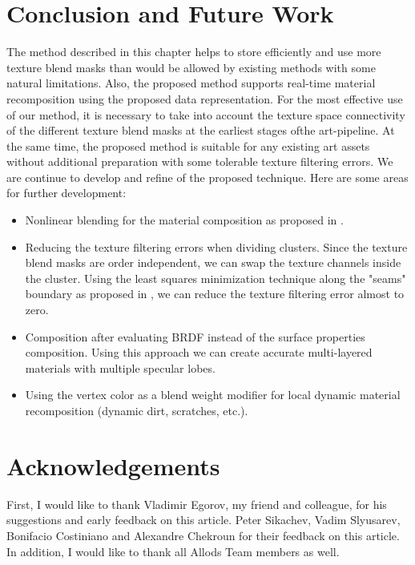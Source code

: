\section{Conclusion and Future Work}

The method described in this chapter helps to store efficiently and use more texture blend masks than would be allowed by existing methods with some natural limitations.
Also, the proposed method supports real-time material recomposition using the proposed data representation. 
For the most effective use of our method, it is necessary to take into account the texture space connectivity of the different texture blend masks at the earliest stages ofthe  art-pipeline.
At the same time, the proposed method is suitable for any existing art assets without additional preparation with some tolerable texture filtering errors.
We are continue to develop and refine of the proposed technique.
Here are some areas for further development:

\begin{itemize}  
\item Nonlinear blending for the material composition as proposed in \cite{BlendMaps}.
\item Reducing the texture filtering errors when dividing clusters.
Since the texture blend masks are order independent, we can swap the texture channels inside the cluster.
Using the least squares minimization technique along the "seams" boundary as proposed in \cite{IwanickiLightmaps}, we can reduce the texture filtering error almost to zero.
\item Composition after evaluating BRDF instead of the surface properties composition.
Using this approach we can create accurate multi-layered materials with multiple specular lobes.
\item Using the vertex color as a blend weight modifier for local dynamic material recomposition (dynamic dirt, scratches, etc.).
\end{itemize}

\section{Acknowledgements}

First, I would like to thank Vladimir Egorov, my friend and colleague, for his suggestions and early feedback on this article.
Peter Sikachev, Vadim Slyusarev, Bonifacio Costiniano and Alexandre Chekroun for their feedback on this article.
In addition, I would like to thank all Allods Team members as well.

